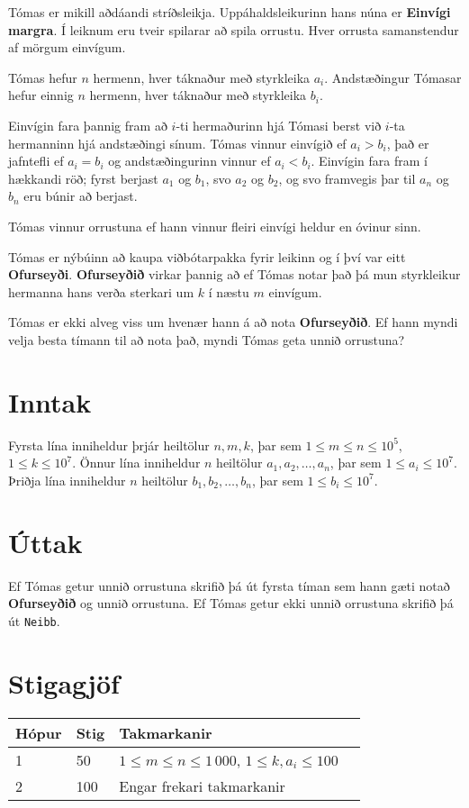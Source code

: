 
\noindent
Tómas er mikill aðdáandi stríðsleikja. Uppáhaldsleikurinn hans núna er \textbf{Einvígi margra}.
Í leiknum eru tveir spilarar að spila orrustu. Hver orrusta samanstendur af mörgum einvígum.

Tómas hefur $n$ hermenn, hver táknaður með styrkleika $a_i$.
Andstæðingur Tómasar hefur einnig $n$ hermenn, hver táknaður með styrkleika $b_i$.

Einvígin fara þannig fram að $i$-ti hermaðurinn hjá Tómasi berst við $i$-ta hermanninn hjá andstæðingi sínum.
Tómas vinnur einvígið ef $a_i > b_i$, það er jafntefli ef $a_i = b_i$ og andstæðingurinn vinnur ef $a_i < b_i$.
Einvígin fara fram í hækkandi röð; fyrst berjast $a_1$ og $b_1$, svo $a_2$ og $b_2$, og svo framvegis þar til $a_n$ og $b_n$ eru búnir að berjast.

Tómas vinnur orrustuna ef hann vinnur fleiri einvígi heldur en óvinur sinn.

Tómas er nýbúinn að kaupa viðbótarpakka fyrir leikinn og í því var eitt \textbf{Ofurseyði}.
\textbf{Ofurseyðið} virkar þannig að ef Tómas notar það þá mun styrkleikur hermanna hans verða sterkari um $k$ í næstu $m$ einvígum.

Tómas er ekki alveg viss um hvenær hann á að nota \textbf{Ofurseyðið}.
Ef hann myndi velja besta tímann til að nota það, myndi Tómas geta unnið orrustuna?

\section*{Inntak}
Fyrsta lína inniheldur þrjár heiltölur $n,m,k$, þar sem $1 \le m \le n \le 10^5$, $1 \le k \le 10^7$.
Önnur lína inniheldur $n$ heiltölur $a_1, a_2, \dotsc, a_n$, þar sem $1 \le a_i \le 10^7$.
Þriðja lína inniheldur $n$ heiltölur $b_1, b_2, \dotsc, b_n$, þar sem $1 \le b_i \le 10^7$.

\section*{Úttak}
Ef Tómas getur unnið orrustuna skrifið þá út fyrsta tíman sem hann gæti notað \textbf{Ofurseyðið}
og unnið orrustuna. Ef Tómas getur ekki unnið orrustuna skrifið þá út \texttt{Neibb}.

\section*{Stigagjöf}
\begin{tabular}{|l|l|l|l|}
\hline
Hópur & Stig & Takmarkanir \\ \hline
1     & 50  & $1 \le m \le n \le 1\,000$, $1 \le k, a_i \le 100$ \\ \hline
2     & 100  & Engar frekari takmarkanir \\ \hline
\end{tabular}
